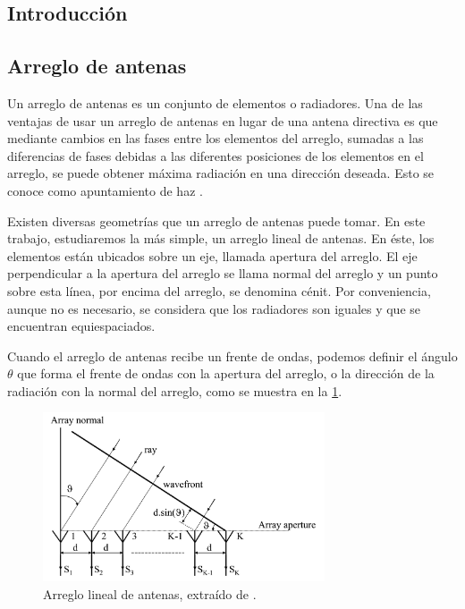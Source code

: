 \documentclass{article}
\newenvironment{standalone}{\begin{preview}}{\end{preview}}
\begin{document}
\begin{standalone}
  \section{Introducción}

  \subsection{Arreglo de antenas} \label{subsec:arreglo}

  Un arreglo de antenas es un conjunto de elementos o radiadores.
  Una de las ventajas de usar un arreglo de antenas en lugar de una antena directiva es que mediante cambios en las fases entre los elementos del arreglo, sumadas a las diferencias de fases debidas a las diferentes posiciones de los elementos en el arreglo, se puede obtener máxima radiación en una dirección deseada.
  Esto se conoce como apuntamiento de haz \cite{visser2005}.

  Existen diversas geometrías que un arreglo de antenas puede tomar.
  En este trabajo, estudiaremos la más simple, un arreglo lineal de antenas.
  En éste, los elementos están ubicados sobre un eje, llamada apertura del arreglo.
  El eje perpendicular a la apertura del arreglo se llama normal del arreglo y un punto sobre esta línea, por encima del arreglo, se denomina cénit.
  Por conveniencia, aunque no es necesario, se considera que los radiadores son iguales y que se encuentran equiespaciados.

  Cuando el arreglo de antenas recibe un frente de ondas, podemos definir el ángulo $\theta$ que forma el frente de ondas con la apertura del arreglo, o la dirección de la radiación con la normal del arreglo, como se muestra en la \cref{fig:arreglo-antenas}.

  \begin{figure}[!htbp]
    \centering
    \includegraphics[width=\linewidth, height=50mm, keepaspectratio]{../images/arreglo-antenas.jpg}
    \caption{Arreglo lineal de antenas, extraído de \cite{visser2005}.}
    \label{fig:arreglo-antenas}
  \end{figure}


\end{standalone}
\end{document}
